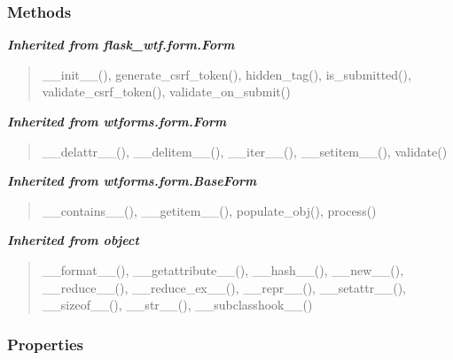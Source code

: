 
  \subsubsection{Methods}


\large{\textbf{\textit{Inherited from flask\_wtf.form.Form}}}

\begin{quote}
\_\_init\_\_(), generate\_csrf\_token(), hidden\_tag(), is\_submitted(), validate\_csrf\_token(), validate\_on\_submit()
\end{quote}

\large{\textbf{\textit{Inherited from wtforms.form.Form}}}

\begin{quote}
\_\_delattr\_\_(), \_\_delitem\_\_(), \_\_iter\_\_(), \_\_setitem\_\_(), validate()
\end{quote}

\large{\textbf{\textit{Inherited from wtforms.form.BaseForm}}}

\begin{quote}
\_\_contains\_\_(), \_\_getitem\_\_(), populate\_obj(), process()
\end{quote}

\large{\textbf{\textit{Inherited from object}}}

\begin{quote}
\_\_format\_\_(), \_\_getattribute\_\_(), \_\_hash\_\_(), \_\_new\_\_(), \_\_reduce\_\_(), \_\_reduce\_ex\_\_(), \_\_repr\_\_(), \_\_setattr\_\_(), \_\_sizeof\_\_(), \_\_str\_\_(), \_\_subclasshook\_\_()
\end{quote}


  \subsubsection{Properties}

